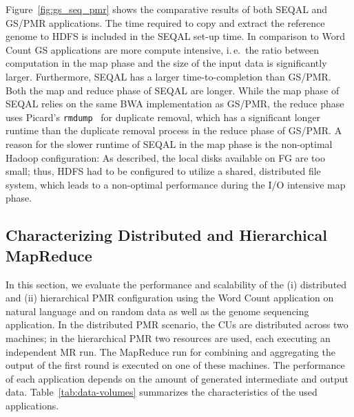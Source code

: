 \documentclass{sig-alternate}
\newcommand{\jhanote}[1]{ {\textcolor{red} { ***SJ: #1 }}}
\newcommand{\alnote}[1]{ {\textcolor{blue} { ***andreL: #1 }}}
\newcommand{\pnote}[1]{ {\textcolor{magenta} { ***pradeep: #1 }}}
\newcommand{\alnote}[1]{}
\newcommand{\pnote}[1]{}
\newcommand{\jhanote}[1]{}
\newcommand{\upp}{\vspace*{-0.5em}}
\begin{document}
Figure~\ref{fig:gs_seq_pmr} shows the comparative results of both
SEQAL and GS/PMR applications. The time required to copy and extract
the reference genome to HDFS is included in the SEQAL set-up time. In
comparison to Word Count GS applications are more compute intensive,
i.\,e.\ the ratio between computation in the map phase and the size of
the input data is significantly larger. Furthermore, SEQAL has a larger
time-to-completion than GS/PMR. Both the map and reduce phase of SEQAL
are longer. While the map phase of SEQAL relies on the same BWA
implementation as GS/PMR, the reduce phase uses Picard's
\texttt{rmdump}~\cite{picard} for duplicate removal, which has a
significant longer runtime than the duplicate removal process in the
reduce phase of GS/PMR.
A reason for the slower runtime of SEQAL in the map phase is the non-optimal
Hadoop configuration: As described, the local disks available on FG are too
small; thus, HDFS had to be configured to utilize a shared, distributed file
system, which leads to a non-optimal performance during the I/O intensive map
phase.


\upp
\subsection{Characterizing Distributed and Hierarchical MapReduce}


In this section, we evaluate the performance and scalability of the (i)
distributed and (ii) hierarchical PMR configuration using the Word Count
application on natural language and on random data as well as the genome
sequencing application. In the distributed PMR scenario, the CUs are
distributed across two machines; in the hierarchical PMR two resources are used,
each executing an independent MR run. The MapReduce run for combining and
aggregating the output of the first round is executed on one of these machines.
The performance of each application depends on the amount of generated
intermediate and output data. Table~\ref{tab:data-volumes} summarizes the
characteristics of the used applications.
\end{document}
